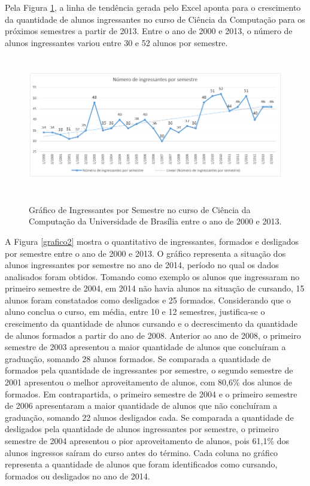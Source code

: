 Pela Figura \ref{grafico1}, a linha de tendência gerada pelo Excel aponta para o crescimento da quantidade de alunos ingressantes no curso de Ciência da Computação para os próximos semestres a partir de 2013. Entre o ano de 2000 e 2013, o número de alunos ingressantes variou entre 30 e 52 alunos por semestre.

\begin{figure}[!h]
	\centering
	{\includegraphics[width=16cm, height=6cm]{images/grafico1}}
	\caption {Gráfico de Ingressantes por Semestre no curso de Ciência da Computação da Universidade de Brasília entre o ano de 2000 e 2013.}
	\label{grafico1}
\end{figure}
  

A Figura \ref{grafico2} mostra o quantitativo de ingressantes, formados e desligados por semestre entre o ano de 2000 e 2013. O gráfico representa a situação dos alunos ingressantes por semestre no ano de 2014, período no qual os dados analisados foram obtidos. Tomando como exemplo os alunos que ingressaram no primeiro semestre de 2004, em 2014 não havia alunos na situação de cursando, 15 alunos foram constatados como desligados e 25 formados. Considerando que o aluno conclua o curso, em média, entre 10 e 12 semestres, justifica-se o crescimento da quantidade de alunos cursando e o decrescimento da quantidade de alunos formados a partir do ano de 2008. Anterior ao ano de 2008, o primeiro semestre de 2003 apresentou a maior quantidade de alunos que concluíram a graduação, somando 28 alunos formados. Se comparada a quantidade de formados pela quantidade de ingressantes por semestre, o segundo semestre de 2001 apresentou o melhor aproveitamento de alunos, com 80,6\% dos alunos de formados. Em contrapartida, o primeiro semestre de 2004 e o primeiro semestre de 2006 apresentaram a maior quantidade de alunos que não concluíram a graduação, somando 22 alunos desligados cada. Se comparada a quantidade de desligados pela quantidade de alunos ingressantes por semestre, o primeiro semestre de 2004 apresentou o pior aproveitamento de alunos, pois 61,1\% dos alunos ingressos saíram do curso antes do término. Cada coluna no gráfico representa a quantidade de alunos que foram identificados como cursando, formados ou desligados no ano de 2014.


